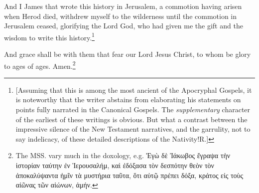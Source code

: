 \pend\pstart
{}

\pend\pstart
And I James that wrote this history in Jerusalem, a commotion having arisen when Herod died, withdrew myself to the wilderness until the commotion in Jerusalem ceased, glorifying the Lord God, who had given me the gift and the wisdom to write this history.\footnote{[Assuming that this is among the most ancient of the Apocryphal Gospels, it is noteworthy that the writer abstains from elaborating his statements on points fully narrated in the Canonical Gospels. The \textit{supplementary} character of the earliest of these writings is obvious. But what a contrast between the impressive silence of the New Testament narratives, and the garrulity, not to say indelicacy, of these detailed descriptions of the Nativity!\textemdash R.]}

\pend\pstart
And grace shall be with them that fear our Lord Jesus Christ, to whom be glory to ages of ages. Amen.\footnote{The MSS. vary much in the doxology, e.g. Ἐγὼ δὲ Ἰάκωβος ἔγραψα τὴν ἱστορίαν ταύτην ἐν Ἱερουσαλήμ, καὶ ἐδόξασα τὸν δεσπότην θεὸν τὸν ἀποκαλύψαντα ἡμῖν τὰ μυστήρια ταῦτα, ὅτι αὐτῷ πρέπει δόξα, κράτος εἰς τοὺς αἰῶνας τῶν αἰώνων, ἀμήν.}

\pend
